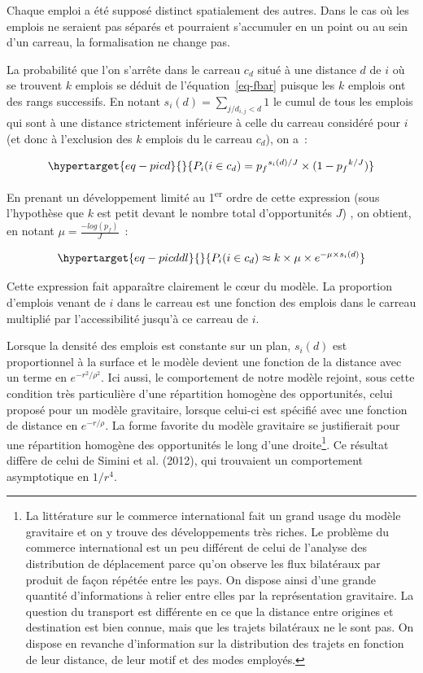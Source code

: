 \documentclass[
  10pt,
  a4paper,
  numbers=noendperiod,
  DIV=9]{scrreprt}
\begin{document}
Chaque emploi a été supposé distinct spatialement des autres. Dans le
cas où les emplois ne seraient pas séparés et pourraient s'accumuler en
un point ou au sein d'un carreau, la formalisation ne change pas.

La probabilité que l'on s'arrête dans le carreau \(c_d\) situé à une
distance \(d\) de \(i\) où se trouvent \(k\) emplois se déduit de
l'équation~\ref{eq-fbar} puisque les \(k\) emplois ont des rangs
successifs. En notant \(s_i(d)=\sum _{j/d_{i,j}<d}1\) le cumul de tous
les emplois qui sont à une distance strictement inférieure à celle du
carreau considéré pour \(i\) (et donc à l'exclusion des \(k\) emplois du
le carreau \(c_d\)), on a~:

\begin{equation}\protect\hypertarget{eq-picd}{}{
P_i(i\in c_d) = {p_f}^{s_i(d)/J}\times(1-{p_f}^{ k/J})
}\label{eq-picd}\end{equation}

En prenant un développement limité au 1\textsuperscript{er} ordre de
cette expression (sous l'hypothèse que \(k\) est petit devant le nombre
total d'opportunités \(J\)) , on obtient, en notant
\(\mu=\frac{-log(p_f)}{J}\)~:

\begin{equation}\protect\hypertarget{eq-picddl}{}{
P_i(i\in c_d) \approx k\times \mu \times e^{-\mu \times s_i(d)}
}\label{eq-picddl}\end{equation}

Cette expression fait apparaître clairement le cœur du modèle. La
proportion d'emplois venant de \(i\) dans le carreau est une fonction
des emplois dans le carreau multiplié par l'accessibilité jusqu'à ce
carreau de \(i\).

Lorsque la densité des emplois est constante sur un plan, \(s_i(d)\) est
proportionnel à la surface et le modèle devient une fonction de la
distance avec un terme en \(e^{-r^2/\rho^2}\). Ici aussi, le
comportement de notre modèle rejoint, sous cette condition très
particulière d'une répartition homogène des opportunités, celui proposé
pour un modèle gravitaire, lorsque celui-ci est spécifié avec une
fonction de distance en \(e^{-r/\rho}\). La forme favorite du modèle
gravitaire se justifierait pour une répartition homogène des
opportunités le long d'une droite\footnote{La littérature sur le
  commerce international fait un grand usage du modèle gravitaire et on
  y trouve des développements très riches. Le problème du commerce
  international est un peu différent de celui de l'analyse des
  distribution de déplacement parce qu'on observe les flux bilatéraux
  par produit de façon répétée entre les pays. On dispose ainsi d'une
  grande quantité d'informations à relier entre elles par la
  représentation gravitaire. La question du transport est différente en
  ce que la distance entre origines et destination est bien connue, mais
  que les trajets bilatéraux ne le sont pas. On dispose en revanche
  d'information sur la distribution des trajets en fonction de leur
  distance, de leur motif et des modes employés.}. Ce résultat diffère
de celui de Simini et al. (2012), qui trouvaient un comportement
asymptotique en \(1/r^4\).
\end{document}

